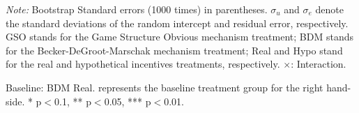 \documentclass[12pt]{article}
\begin{document}
\begin{table}[H]
\begin{tablenotes}
            \footnotesize
            \item \textit{Note:} Bootstrap Standard errors (1000 times) in parentheses.  $\sigma_u$ and $\sigma_e$ denote the standard deviations of the random intercept and residual error, respectively. GSO stands for the Game Structure Obvious mechanism treatment; BDM stands for the Becker-DeGroot-Marschak mechanism treatment; Real and Hypo stand for the real and hypothetical incentives treatments, respectively. $\times$: Interaction.
           \item Baseline: BDM Real. represents the baseline treatment group for the right hand-side. * p$<$0.1, ** p$<$0.05, *** p$<$0.01.
        \end{tablenotes}
\end{table}



\clearpage
\end{document}
